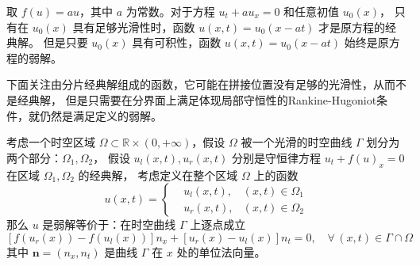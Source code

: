 \begin{example}
    取 $f(u) = a u$，其中 $a$ 为常数。对于方程 $u_t + a u_x = 0$ 和任意初值 $u_0(x)$，
    只有在 $u_0(x)$ 具有足够光滑性时，函数 $u(x,t) = u_0(x - a t)$ 才是原方程的经典解。
    但是只要 $u_0(x)$ 具有可积性，函数 $u(x,t) = u_0(x - a t)$ 始终是原方程的弱解。
\end{example}



下面关注由分片经典解组成的函数，它可能在拼接位置没有足够的光滑性，从而不是经典解，
但是只需要在分界面上满足体现局部守恒性的Rankine-Hugoniot条件，就仍然是满足定义的弱解。

\begin{theorem}\label{thm:rh-jump}
    考虑一个时空区域 $\Omega \subset \mathbb{R} \times (0,+\infty)$，假设 $\Omega$ 被一个光滑的时空曲线 $\Gamma$ 划分为两个部分：$\Omega_1,\Omega_2$，
    假设 $u_l(x,t),u_r(x,t)$ 分别是守恒律方程 $u_t + f(u)_x = 0$ 在区域 $\Omega_1,\Omega_2$ 的经典解，
    考虑定义在整个区域 $\Omega$ 上的函数
    \[
        u(x,t) =
        \left\{
        \begin{aligned}
             & u_l(x,t), & (x,t) \in \Omega_1 \\
             & u_r(x,t), & (x,t) \in \Omega_2
        \end{aligned}
        \right.
    \]
    那么 $u$ 是弱解等价于：在时空曲线 $\Gamma$ 上逐点成立
    \[
        \left[f(u_r(x)) - f(u_l(x))\right]n_x +
        \left[u_r(x) - u_l(x)\right]n_t = 0, \quad \forall\, (x,t) \in \Gamma \cap \Omega
    \]
    其中 $\bm{n}=(n_x,n_t)$ 是曲线 $\Gamma$ 在 $x$ 处的单位法向量。
\end{theorem}

